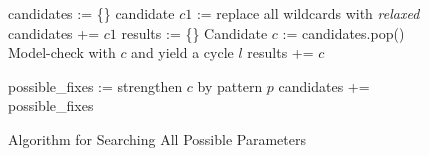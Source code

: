 \begin{figure}[!htbp]
\begin{algorithmic}[1]
\State candidates := \{\}
\State candidate $c1$ := replace all wildcards with \textit{relaxed}
\State candidates += $c1$
\State results := \{\}
\State Candidate $c$ := candidates.pop()
\State Model-check with $c$ and yield a cycle $l$
\State results += $c$
\Else
\State {}
\EndIf
\EndWhile
\State {}
\EndFunction

\State possible\_fixes := strengthen $c$ by pattern $p$
\State candidates += possible\_fixes 
\EndWhile
\EndProcedure

\end{algorithmic}
\caption{\label{fig:algorithm}Algorithm for Searching All Possible Parameters}
\end{figure}

